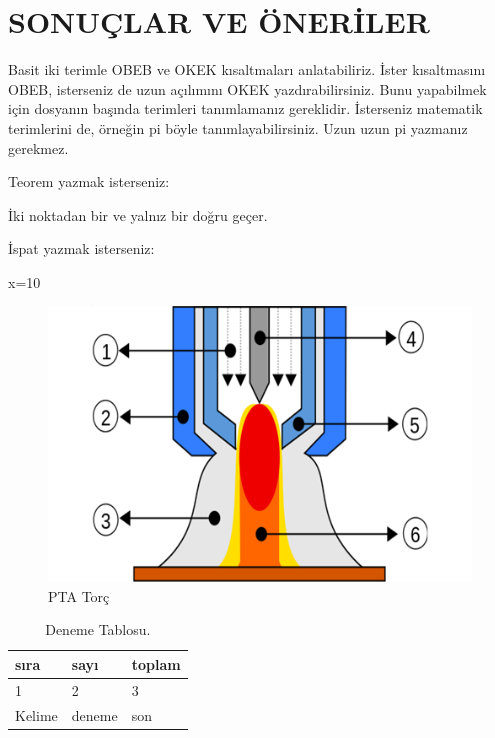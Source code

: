 \chapter{SONUÇLAR VE ÖNERİLER}

Basit iki terimle \acrfull{OBEB} ve \acrfull{OKEK} kısaltmaları anlatabiliriz. İster kısaltmasını \acrshort{OBEB}, isterseniz de uzun açılımını \acrlong{OKEK} yazdırabilirsiniz. Bunu yapabilmek için dosyanın başında terimleri tanımlamanız gereklidir. İsterseniz matematik terimlerini de, örneğin \acrshort{pi} böyle tanımlayabilirsiniz. Uzun uzun \acrfull{pi} yazmanız gerekmez. 

Teorem yazmak isterseniz:
\begin{theorem}[Öklid]
 İki noktadan bir ve yalnız bir doğru geçer.
\end{theorem}

İspat yazmak isterseniz:
\begin{ispat}
x=10
\end{ispat}
\lipsum[1-2]
\begin{figure}[h]
\centering
\includegraphics[width=\textwidth]{gorseller/ptaTorc}
\caption{PTA Torç}\label{fig:PtaTorc1}
\end{figure}
\lipsum[1-2]
\begin{table}
\centering
\caption{Deneme Tablosu.}\label{tab:den1}
\begin{tabular}{|l|l|l|}
\hline
sıra   & sayı   & toplam \\ \hline
1      & 2      & 3      \\ \hline
Kelime & deneme & son    \\ \hline
\end{tabular}
\end{table}


